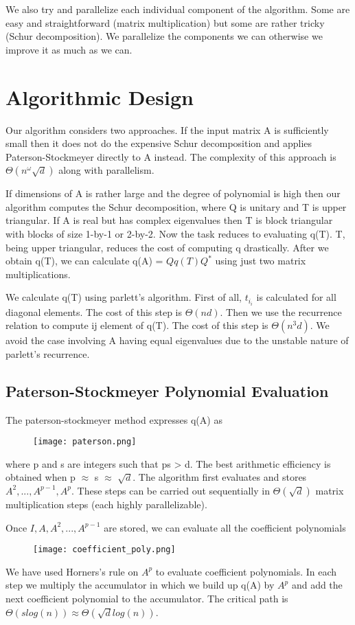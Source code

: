 \documentclass{article}
\begin{document}
We also try and parallelize each individual component of the algorithm. Some are easy and straightforward (matrix multiplication) but some are rather tricky (Schur decomposition). We parallelize the components we can otherwise we improve it as much as we can. 



\section{Algorithmic Design}

Our algorithm considers two approaches. If the input matrix A is sufficiently small then it does not do the expensive Schur decomposition and applies Paterson-Stockmeyer directly to A instead. The complexity of this approach is $\Theta(n^{\omega}\sqrt{d})$ along with parallelism. \par
If dimensions of A is rather large and the degree of polynomial is high then our algorithm computes the Schur decomposition, where Q is unitary and T is upper triangular. If A is real but has complex eigenvalues then T is block triangular with blocks of size 1-by-1 or 2-by-2. Now the task reduces to evaluating q(T). T, being upper triangular, reduces the cost of computing q drastically. After we obtain q(T), we can calculate q(A) = $Qq(T)Q^*$ using just two matrix multiplications. \par
We calculate q(T) using parlett's algorithm. First of all, $t_i_i$ is calculated for all diagonal elements. The cost of this step is $\Theta(nd)$. Then we use the recurrence relation to compute ij element of q(T). The cost of this step is $\Theta(n^3d)$. We avoid the case involving A having equal eigenvalues due to the unstable nature of parlett's recurrence. \par


\subsection{Paterson-Stockmeyer Polynomial Evaluation}\par
The paterson-stockmeyer method expresses q(A) as
\begin{figure}[H]
 \centering
 \texttt{[image: paterson.png]}
\end{figure}
where p and s are integers such that ps > d. The best arithmetic efficiency is obtained when p $\approx$ s $\approx$ $\sqrt{d}$. The algorithm first evaluates and stores $A^{2},...,A^{p-1},A^{p}$. These steps can be carried out sequentially in $\Theta(\sqrt{d})$ matrix multiplication steps (each highly parallelizable).\par
Once $I,A,A^{2},...,A^{p-1}$ are stored, we can evaluate all the coefficient polynomials
\begin{figure}[H]
 \centering
 \texttt{[image: coefficient\_poly.png]}
\end{figure}
We have used Horners's rule on $A^{p}$ to evaluate coefficient polynomials. In each step we multiply the accumulator in which we build up q(A) by $A^{p}$ and add the next coefficient polynomial to the accumulator. The critical path is $\Theta(slog(n)) \approx \Theta(\sqrt{d}log(n))$.
\end{document}
